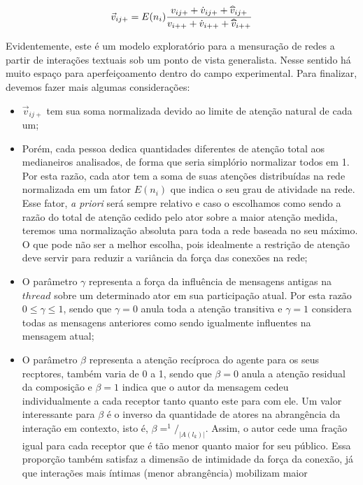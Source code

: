 \begin{equation}
\label{def:atetotal}
\vec{v}_{ij+} = E(n_i)\frac{v_{ij+} + \dot{v}_{ij+} +
\widetriangle{v}_{ij+}}{v_{i++} + \dot{v}_{i++} + \widetriangle{v}_{i++}}
\end{equation}

Evidentemente, este é um modelo exploratório para a mensuração de redes a partir
de interações textuais sob um ponto de vista generalista. Nesse sentido há muito
espaço para aperfeiçoamento dentro do campo experimental. Para finalizar,
devemos fazer mais algumas considerações:
\begin{itemize}
  \item $\vec{v}_{ij+}$ tem sua soma normalizada devido ao limite de atenção
  natural de cada um;
  \item Porém, cada pessoa dedica quantidades diferentes de atenção total aos
  medianeiros analisados, de forma que seria simplório normalizar todos em 1.
  Por esta razão, cada ator tem a soma de suas atenções distribuídas na rede
  normalizada em um fator $E(n_i)$ que indica o seu grau de atividade na rede.
  Esse fator, \emph{a priori} será sempre relativo e caso o escolhamos como
  sendo a razão do total de atenção cedido pelo ator sobre a maior atenção
  medida, teremos uma normalização absoluta para toda a rede baseada no seu
  máximo. O que pode não ser a melhor escolha, pois idealmente a restrição de
  atenção deve servir para reduzir a variância da força das conexões na rede;
  \item O parâmetro $\gamma$ representa a força da influência de mensagens
  antigas na $thread$ sobre um determinado ator em sua participação atual. Por
  esta razão $0 \leq \gamma \leq 1$, sendo que $\gamma=0$ anula toda a atenção
  transitiva e $\gamma=1$ considera todas as mensagens anteriores como sendo
  igualmente influentes na mensagem atual;
  \item O parâmetro $\beta$ representa a atenção recíproca do agente para os
  seus recptores, também varia de 0 a 1, sendo que $\beta=0$ anula a atenção
  residual da composição e $\beta=1$ indica que o autor da mensagem cedeu
  individualmente a cada receptor tanto quanto este para com ele. Um valor
  interessante para $\beta$ é o inverso da quantidade de atores na abrangência
  da interação em contexto, isto é, $\beta=^1/_{|A(l_k)|}$. Assim, o autor cede
  uma fração igual para cada receptor que é tão menor quanto maior for seu
  público. Essa proporção também satisfaz a dimensão de intimidade da força da
  conexão, já que interações mais íntimas (menor abrangência) mobilizam maior

\end{itemize}
